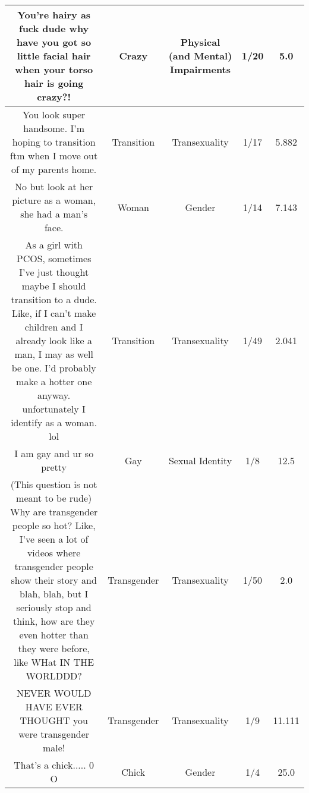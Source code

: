 \documentclass[11pt]{article}
\newlength\mylength
\begin{document}
\begin{center}
\begin{longtable}{|C{.40\mylength}|C{.30\mylength}|C{.15\mylength}|C{.15\mylength}|C{.15\mylength}|}
  You're hairy as fuck dude why have you got so little facial hair when your torso hair is going crazy?!  & Crazy & Physical (and Mental) Impairments & 1/20 & 5.0 \\  \hline
  You look super handsome. I'm hoping to transition ftm when I move out of my parents home.  & Transition & Transexuality & 1/17 & 5.882 \\  \hline
  No but look at her picture as a woman, she had a man's face.  & Woman & Gender & 1/14 & 7.143 \\  \hline
  As a girl with PCOS, sometimes I've just thought maybe I should transition to a dude. Like, if I can't make children and I already look like a man, I may as well be one. I'd probably make a hotter one anyway. unfortunately I identify as a woman. lol  & Transition & Transexuality & 1/49 & 2.041 \\  \hline
  I am gay and ur so pretty     & Gay & Sexual Identity & 1/8 & 12.5 \\  \hline
  (This question is not meant to be rude) Why are transgender people so hot? Like, I've seen a lot of videos where transgender people show their story and blah, blah, but I seriously stop and think, how are they even hotter than they were before, like WHat IN THE WORLDDD?  & Transgender & Transexuality & 1/50 & 2.0 \\  \hline
  NEVER WOULD HAVE EVER THOUGHT you were transgender male!  & Transgender & Transexuality & 1/9 & 11.111 \\  \hline
  That's a chick..... 0 O  & Chick & Gender & 1/4 & 25.0 \\  \hline

\end{longtable}
\end{center}
\end{document}
